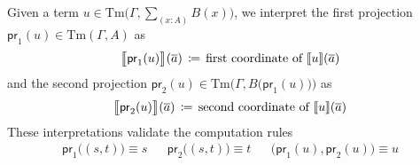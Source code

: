 \documentclass{article}
\theoremstyle{definition}
\renewcommand{\int}[1]{\mathopen{}\left\llbracket #1
    \right\rrbracket\mathclose{}}       %
\newcommand{\Sig}[2]{\textstyle\sum_{#1} #2}              %
\newcommand{\tproj}{\mathsf{pr}}
\newcommand{\Tm}{\mathrm{Tm}}
\newcommand{\defeq}{
	\mathrel{\mathrel{\mathop:}\mkern-1.2mu=}}	%
\newcommand{\tup}[1]{\overline{\smash{#1}\vphantom{a}}}
\newcommand{\sproj}{\pi}
\begin{document}
{\color{red}
Given a term $u \in \Tm\Big( \Gamma, \Sig{(x:A)}{B(x)} \Big)$, we interpret the first projection $\tproj_1(u) \in \Tm(\Gamma, A)$ as $$\int{\big.\tproj_1(u)}(\tup{a})\, \defeq\, \text{first coordinate of } \int{u}(\tup{a})$$%
and the second projection $\tproj_2(u) \in \Tm \Big( \Gamma, B \big( \tproj_1(u) \big) \Big)$ as $$\int{\big.\tproj_2(u)}(\tup{a})\, \defeq\, \text{second coordinate of } \int{u}(\tup{a})$$%
These interpretations validate the computation rules
\begin{align*}
    \tproj_1 \big( (s,t) \big) \equiv s & & \tproj_2 \big( (s,t) \big) \equiv t & & \big( \tproj_1(u), \tproj_2(u) \big) \equiv u
\end{align*}
}
\end{document}
